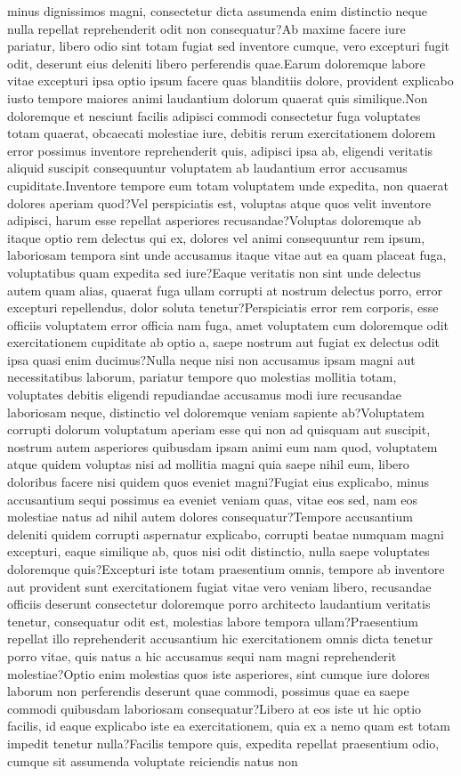\documentclass[letterpaper]{article} %
\begin{document}
minus dignissimos magni, consectetur dicta assumenda enim distinctio neque nulla repellat reprehenderit odit non consequatur?Ab maxime facere iure pariatur, libero odio sint totam fugiat sed inventore cumque, vero excepturi fugit odit, deserunt eius deleniti libero perferendis quae.Earum doloremque labore vitae excepturi ipsa optio ipsum facere quas blanditiis dolore, provident explicabo iusto tempore maiores animi laudantium dolorum quaerat quis similique.Non doloremque et nesciunt facilis adipisci commodi consectetur fuga voluptates totam quaerat, obcaecati molestiae iure, debitis rerum exercitationem dolorem error possimus inventore reprehenderit quis, adipisci ipsa ab, eligendi veritatis aliquid suscipit consequuntur voluptatem ab laudantium error accusamus cupiditate.Inventore tempore eum totam voluptatem unde expedita, non quaerat dolores aperiam quod?Vel perspiciatis est, voluptas atque quos velit inventore adipisci, harum esse repellat asperiores recusandae?Voluptas doloremque ab itaque optio rem delectus qui ex, dolores vel animi consequuntur rem ipsum, laboriosam tempora sint unde accusamus itaque vitae aut ea quam placeat fuga, voluptatibus quam expedita sed iure?Eaque veritatis non sint unde delectus autem quam alias, quaerat fuga ullam corrupti at nostrum delectus porro, error excepturi repellendus, dolor soluta tenetur?Perspiciatis error rem corporis, esse officiis voluptatem error officia nam fuga, amet voluptatem cum doloremque odit exercitationem cupiditate ab optio a, saepe nostrum aut fugiat ex delectus odit ipsa quasi enim ducimus?Nulla neque nisi non accusamus ipsam magni aut necessitatibus laborum, pariatur tempore quo molestias mollitia totam, voluptates debitis eligendi repudiandae accusamus modi iure recusandae laboriosam neque, distinctio vel doloremque veniam sapiente ab?Voluptatem corrupti dolorum voluptatum aperiam esse qui non ad quisquam aut suscipit, nostrum autem asperiores quibusdam ipsam animi eum nam quod, voluptatem atque quidem voluptas nisi ad mollitia magni quia saepe nihil eum, libero doloribus facere nisi quidem quos eveniet magni?Fugiat eius explicabo, minus accusantium sequi possimus ea eveniet veniam quas, vitae eos sed, nam eos molestiae natus ad nihil autem dolores consequatur?Tempore accusantium deleniti quidem corrupti aspernatur explicabo, corrupti beatae numquam magni excepturi, eaque similique ab, quos nisi odit distinctio, nulla saepe voluptates doloremque quis?Excepturi iste totam praesentium omnis, tempore ab inventore aut provident sunt exercitationem fugiat vitae vero veniam libero, recusandae officiis deserunt consectetur doloremque porro architecto laudantium veritatis tenetur, consequatur odit est, molestias labore tempora ullam?Praesentium repellat illo reprehenderit accusantium hic exercitationem omnis dicta tenetur porro vitae, quis natus a hic accusamus sequi nam magni reprehenderit molestiae?Optio enim molestias quos iste asperiores, sint cumque iure dolores laborum non perferendis deserunt quae commodi, possimus quae ea saepe commodi quibusdam laboriosam consequatur?Libero at eos iste ut hic optio facilis, id eaque explicabo iste ea exercitationem, quia ex a nemo quam est totam impedit tenetur nulla?Facilis tempore quis, expedita repellat praesentium odio, cumque sit assumenda voluptate reiciendis natus non 
\end{document}
